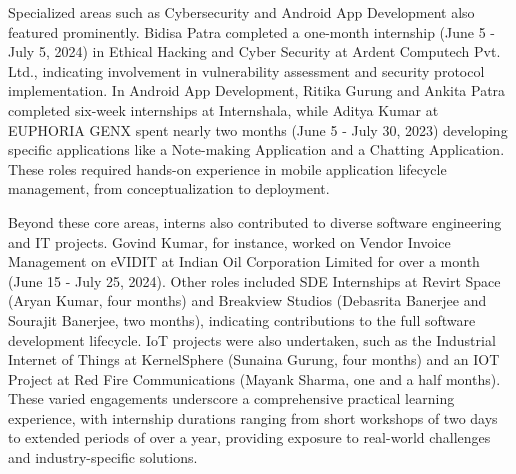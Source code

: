 \documentclass[11pt,a4paper]{article}
\newenvironment{card}{
    \begin{tcolorbox}[
        enhanced,
        colback=cardback,
        colframe=border,
        sharp corners,
        boxrule=0.5pt,
        drop shadow,
        shadow xshift=1mm,
        shadow yshift=-1mm,
        shadow color=border!50,
        boxsep=3mm,
        left=5mm, right=5mm, top=5mm, bottom=5mm,
        width=\textwidth,
        nobeforeafter
    ]
}{\end{tcolorbox}}
\begin{document}
\begin{card}
    Specialized areas such as Cybersecurity and Android App Development also featured prominently. Bidisa Patra completed a one-month internship (June 5 - July 5, 2024) in Ethical Hacking and Cyber Security at Ardent Computech Pvt. Ltd., indicating involvement in vulnerability assessment and security protocol implementation. In Android App Development, Ritika Gurung and Ankita Patra completed six-week internships at Internshala, while Aditya Kumar at EUPHORIA GENX spent nearly two months (June 5 - July 30, 2023) developing specific applications like a Note-making Application and a Chatting Application. These roles required hands-on experience in mobile application lifecycle management, from conceptualization to deployment.

    Beyond these core areas, interns also contributed to diverse software engineering and IT projects. Govind Kumar, for instance, worked on Vendor Invoice Management on eVIDIT at Indian Oil Corporation Limited for over a month (June 15 - July 25, 2024). Other roles included SDE Internships at Revirt Space (Aryan Kumar, four months) and Breakview Studios (Debasrita Banerjee and Sourajit Banerjee, two months), indicating contributions to the full software development lifecycle. IoT projects were also undertaken, such as the Industrial Internet of Things at KernelSphere (Sunaina Gurung, four months) and an IOT Project at Red Fire Communications (Mayank Sharma, one and a half months). These varied engagements underscore a comprehensive practical learning experience, with internship durations ranging from short workshops of two days to extended periods of over a year, providing exposure to real-world challenges and industry-specific solutions.
\end{card}

\vspace{0.5cm}
\end{document}
